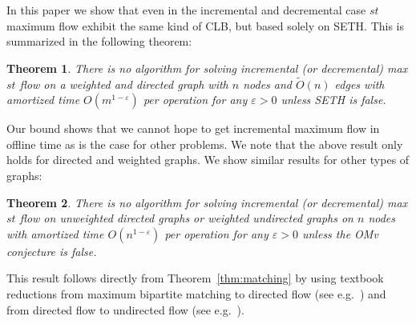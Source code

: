 \documentclass[a4paper,11pt]{article}
\newcommand{\eps}{\varepsilon}
\newcommand{\Ot}{\tilde{O}}
\newtheorem{theorem}{Theorem}
\theoremstyle{definition}
\begin{document}
In this paper we show that even in the incremental and decremental case $st$
maximum flow exhibit the same kind of CLB, but based solely on SETH. This is
summarized in the following theorem:
\begin{theorem}\label{thm:maxflow2}
    There is no algorithm for solving incremental (or decremental) max $st$
    flow on a weighted and directed graph with $n$ nodes and $\Ot(n)$ edges with
    amortized time $O(m^{1-\eps})$ per operation for any $\eps > 0$ unless SETH
    is false.
\end{theorem}
Our bound shows that we cannot hope to get incremental maximum flow in offline
time as is the case for other problems.
We note that the above result only holds for directed
and weighted graphs. We show similar results for other types of graphs:
\begin{theorem}
    There is no algorithm for solving incremental (or decremental) max $st$
    flow on unweighted directed graphs or weighted undirected graphs on $n$
    nodes with amortized time $O(n^{1-\eps})$ per operation for any $\eps > 0$
    unless the OMv conjecture is false.
\end{theorem}
This result follows directly from Theorem~\ref{thm:matching} by using textbook
reductions from maximum bipartite matching to directed flow (see
e.g.~\cite{Cormen09book}) and from directed flow to undirected flow (see
e.g.~\cite{MadryThesis}).
\end{document}
